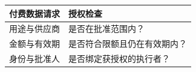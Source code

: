 \begin{tabular}{@{}P{4.0cm}P{8.5cm}@{}}
\toprule
\textbf{付费数据请求} & \textbf{授权检查} \\
\midrule
用途与供应商 & 是否在批准范围内？ \\
金额与有效期 & 是否符合限额且仍在有效期内？ \\
身份与批准人 & 是否绑定获授权的执行者？ \\
\bottomrule
\end{tabular}
